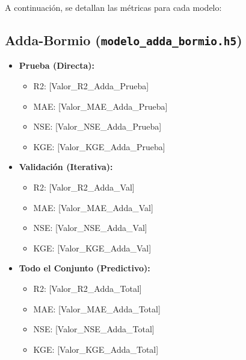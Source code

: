 \documentclass[12pt]{article}
\begin{document}
A continuación, se detallan las métricas para cada modelo:

\subsection*{Adda-Bormio (\texttt{modelo\_adda\_bormio.h5})}
\begin{itemize}
    \item \textbf{Prueba (Directa):}
    \begin{itemize}
        \item R2: [Valor\_R2\_Adda\_Prueba]
        \item MAE: [Valor\_MAE\_Adda\_Prueba]
        \item NSE: [Valor\_NSE\_Adda\_Prueba]
        \item KGE: [Valor\_KGE\_Adda\_Prueba]
    \end{itemize}
    \item \textbf{Validación (Iterativa):}
    \begin{itemize}
        \item R2: [Valor\_R2\_Adda\_Val]
        \item MAE: [Valor\_MAE\_Adda\_Val]
        \item NSE: [Valor\_NSE\_Adda\_Val]
        \item KGE: [Valor\_KGE\_Adda\_Val]
    \end{itemize}
    \item \textbf{Todo el Conjunto (Predictivo):}
    \begin{itemize}
        \item R2: [Valor\_R2\_Adda\_Total]
        \item MAE: [Valor\_MAE\_Adda\_Total]
        \item NSE: [Valor\_NSE\_Adda\_Total]
        \item KGE: [Valor\_KGE\_Adda\_Total]
    \end{itemize}
\end{itemize}
\end{document}
